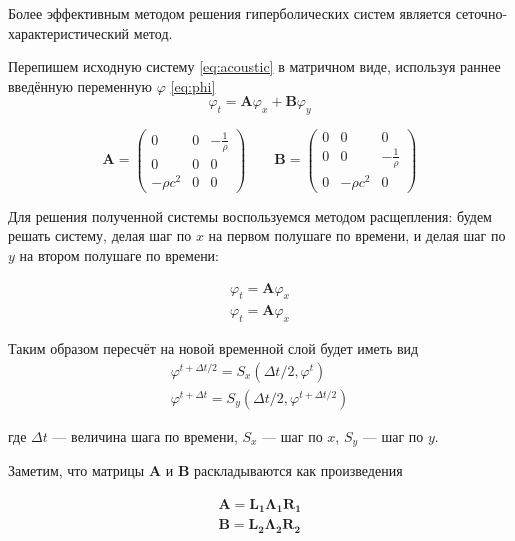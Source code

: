 \documentclass[12pt,a4paper]{article}
\begin{document}
Более эффективным методом решения гиперболических систем является сеточно-характеристический метод.

Перепишем исходную систему \eqref{eq:acoustic} в матричном виде, используя раннее введённую переменную $\varphi$ \eqref{eq:phi} 
\begin{equation}
	\varphi_t = \bm{A} \varphi_x +  \bm{B} \varphi_y
\end{equation}

\begin{equation}
	\bm{A} = \begin{pmatrix}
				0 & 0 & -\frac{1}{\rho} \\
				0 & 0 & 0 \\
				-\rho c^2 & 0 & 0			
		 	 \end{pmatrix} \qquad
	\bm{B} = \begin{pmatrix}
				0 & 0 & 0 \\
				0 & 0 & -\frac{1}{\rho} \\
				0 & -\rho c^2 & 0			
		 	 \end{pmatrix}
\end{equation}

Для решения полученной системы воспользуемся методом расщепления: будем решать систему, делая шаг по $x$ на первом полушаге по времени, и делая шаг по $y$ на втором полушаге по времени:

\begin{gather} 
	\label{eq:eq_split_1} \varphi_t = \bm{A} \varphi_x \\
	\label{eq:eq_split_2} \varphi_t = \bm{A} \varphi_x
\end{gather}

Таким образом пересчёт на новой временной слой будет иметь вид
\begin{gather}
		\varphi^{t+\Delta t / 2} = S_x(\Delta t / 2, \varphi^t)\\
		\varphi^{t+\Delta t}     = S_y(\Delta t / 2, \varphi^{t+\Delta t/2})
\end{gather}

где $\Delta t$ --- величина шага по времени, $S_x$ --- шаг по $x$, $S_y$ --- шаг по $y$.

Заметим, что матрицы $\bm{A}$ и $\bm{B}$ раскладываются как произведения

\begin{gather}
		\bm{A} = \bm{L_1} \bm{\Lambda_1} \bm{R_1}\\
		\bm{B} = \bm{L_2} \bm{\Lambda_2} \bm{R_2}
\end{gather}
\end{document}
